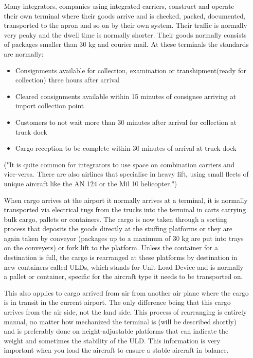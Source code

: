 Many integrators, companies using integrated carriers, construct and operate their own terminal where their goods arrive and is checked, packed, documented, transported to the apron and so on by their own system. 
Their traffic is normally very peaky and the dwell time is normally shorter. Their goods normally consists of packages smaller than 30 kg and courier mail. At these terminals the standards are normally:
\begin{itemize}
\item Consignments available for collection, examination or transhipment(ready for collection) three hours after arrival
\item Cleared consignments available within 15 minutes of consignee arriving at import collection point
\item Customers to not wait more than 30 minutes after arrival for collection at truck dock
\item Cargo reception to be complete within 30 minutes of arrival at truck dock
\end{itemize}

("It is quite common for integrators to use space on combination carriers and vice-versa. There are also airlines that specialise in heavy lift, using small fleets of unique aircraft like the AN 124 or the Mil 10 helicopter.") %

When cargo arrives at the airport it normally arrives at a terminal, it is normally transported via electrical tugs from the trucks into the terminal in carts carrying bulk cargo, pallets or containers. The cargo is now taken through a sorting process that deposits the goods directly at the stuffing platforms or they are again taken by conveyor (packages up to a maximum of 30 kg are put into trays on the conveyers) or fork lift to the platform.
Unless the container for a destination is full, the cargo is rearranged at these platforms by destination in new containers called ULDs, which stands for Unit Load Device and is normally a pallet or container, specific for the aircraft type it needs to be transported on.


This also applies to cargo arrived from air from another air plane where the cargo is in transit in the current airport. The only difference being that this cargo arrives from the air side, not the land side.
This process of rearranging is entirely manual, no matter how mechanized the terminal is (will be described shortly) and is preferably done on height-adjustable platforms that can indicate the weight and sometimes the stability of the ULD. This information is very important when you load the aircraft to ensure a stable aircraft in balance.


